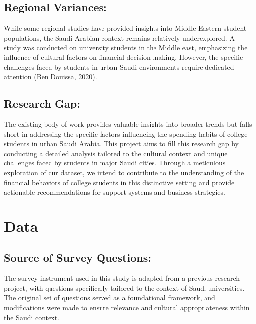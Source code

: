 \documentclass[
]{article}
\begin{document}
\hypertarget{regional-variances}{%
\subsection{Regional Variances:}\label{regional-variances}}

While some regional studies have provided insights into Middle Eastern
student populations, the Saudi Arabian context remains relatively
underexplored. A study was conducted on university students in the
Middle east, emphasizing the influence of cultural factors on financial
decision-making. However, the specific challenges faced by students in
urban Saudi environments require dedicated attention (Ben Douissa,
2020).

\hypertarget{research-gap}{%
\subsection{Research Gap:}\label{research-gap}}

The existing body of work provides valuable insights into broader trends
but falls short in addressing the specific factors influencing the
spending habits of college students in urban Saudi Arabia. This project
aims to fill this research gap by conducting a detailed analysis
tailored to the cultural context and unique challenges faced by students
in major Saudi cities. Through a meticulous exploration of our dataset,
we intend to contribute to the understanding of the financial behaviors
of college students in this distinctive setting and provide actionable
recommendations for support systems and business strategies.

\hypertarget{data}{%
\section{Data}\label{data}}

\hypertarget{source-of-survey-questions}{%
\subsection{Source of Survey
Questions:}\label{source-of-survey-questions}}

The survey instrument used in this study is adapted from a previous
research project, with questions specifically tailored to the context of
Saudi universities. The original set of questions served as a
foundational framework, and modifications were made to ensure relevance
and cultural appropriateness within the Saudi context.
\end{document}
